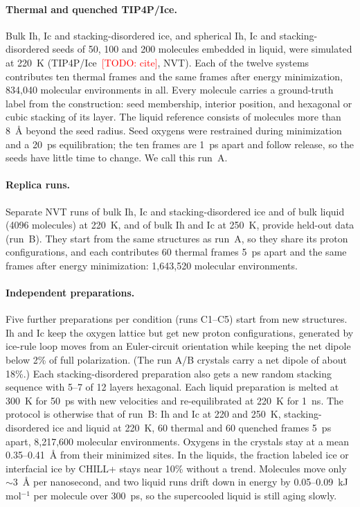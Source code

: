 \documentclass{template1}
\newcommand{\todo}[1]{\textcolor{red}{[TODO: #1]}}
\begin{document}
\paragraph{Thermal and quenched TIP4P/Ice.} Bulk Ih, Ic and
stacking-disordered ice, and spherical Ih, Ic and stacking-disordered seeds of
50, 100 and 200 molecules embedded in liquid, were simulated at 220~K
(TIP4P/Ice~\todo{cite}, NVT). Each of the twelve systems contributes ten
thermal frames and the same frames after energy minimization, 834,040
molecular environments in all. Every molecule carries a ground-truth label
from the construction: seed membership, interior position, and hexagonal or
cubic stacking of its layer. The liquid reference consists of molecules more
than 8~\AA{} beyond the seed radius. Seed oxygens were restrained during
minimization and a 20~ps equilibration; the ten frames are 1~ps apart and
follow release, so the seeds have little time to change. We call this run~A.

\paragraph{Replica runs.} Separate NVT runs of bulk Ih, Ic and
stacking-disordered ice and of bulk liquid (4096 molecules) at 220~K, and of
bulk Ih and Ic at 250~K, provide held-out data (run~B). They start from the
same structures as run~A, so they share its proton configurations, and each
contributes 60 thermal frames 5~ps apart and the same frames after energy
minimization: 1,643,520 molecular environments.

\paragraph{Independent preparations.} Five further preparations per
condition (runs C1--C5) start from new structures. Ih and Ic keep the oxygen
lattice but get new proton configurations, generated by ice-rule loop moves
from an Euler-circuit orientation while keeping the net dipole below 2\% of
full polarization. (The run A/B crystals carry a net dipole of about 18\%.)
Each stacking-disordered preparation also gets a new random stacking sequence
with 5--7 of 12 layers hexagonal. Each liquid preparation is melted at 300~K
for 50~ps with new velocities and re-equilibrated at 220~K for 1~ns. The
protocol is otherwise that of run~B: Ih and Ic at 220 and 250~K,
stacking-disordered ice and liquid at 220~K, 60 thermal and 60 quenched
frames 5~ps apart, 8,217,600 molecular environments. Oxygens in the crystals
stay at a mean 0.35--0.41~\AA{} from their minimized sites. In the liquids,
the fraction labeled ice or interfacial ice by CHILL+ stays near 10\% without
a trend. Molecules move only ${\sim}3$~\AA{} per nanosecond, and two liquid
runs drift down in energy by 0.05--0.09~kJ\,mol$^{-1}$ per molecule over
300~ps, so the supercooled liquid is still aging slowly.
\end{document}
